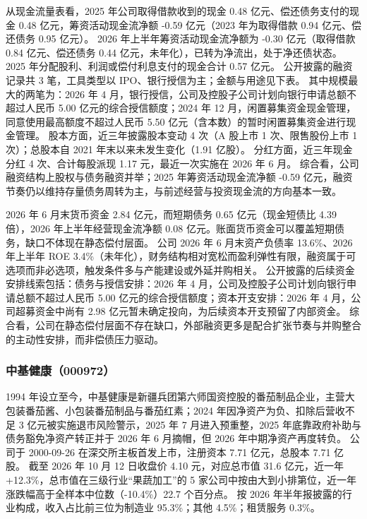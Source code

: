  从现金流量表看，2025 年公司取得借款收到的现金 0.48 亿元、偿还债务支付的现金 0.48 亿元，筹资活动现金流净额 -0.59 亿元（2023 年为取得借款 0.94 亿元、偿还债务 0.95 亿元）。 2026 年上半年筹资活动现金流净额为 -0.30 亿元（取得借款 0.84 亿元、偿还债务 0.44 亿元，未年化），已转为净流出，处于净还债状态。 2025 年分配股利、利润或偿付利息支付的现金合计 0.57 亿元。 公开披露的融资记录共 3 笔，工具类型以 IPO、银行授信为主；金额与用途见下表。 其中规模最大的两笔为：2026 年 4 月，银行授信，公司及控股子公司计划向银行申请总额不超过人民币 5.00 亿元的综合授信额度；2024 年 12 月，闲置募集资金现金管理，同意使用最高额度不超过人民币 5.50 亿元（含本数）的暂时闲置募集资金进行现金管理。 股本方面，近三年披露股本变动 4 次（A 股上市 1 次、限售股份上市 1 次）；总股本自 2021 年末以来未发生变化（1.91 亿股）。 分红方面，近三年现金分红 4 次、合计每股派现 1.17 元，最近一次实施在 2026 年 6 月。 综合看，公司融资结构上股权与债务融资并举；2025 年筹资活动现金流净额 -0.59 亿元，融资节奏仍以维持存量债务周转为主，与前述经营与投资现金流的方向基本一致。

 2026 年 6 月末货币资金 2.84 亿元，而短期债务 0.65 亿元（现金短债比 4.39 倍），2026 年上半年经营现金流净额 0.08 亿元。账面货币资金可以覆盖短期债务，缺口不体现在静态偿付层面。 公司 2026 年 6 月末资产负债率 13.6\%、2026 年上半年 ROE 3.4\%（未年化），财务结构相对宽松而盈利弹性有限，融资属于可选项而非必选项，触发条件多与产能建设或外延并购相关。 公开披露的后续资金安排线索包括：债务与授信安排：2026 年 4 月，公司及控股子公司计划向银行申请总额不超过人民币 5.00 亿元的综合授信额度；资本开支安排：2026 年 4 月，公司超募资金中尚有 2.98 亿元暂未确定投向，为后续资本开支预留了内部资金。 综合看，公司在静态偿付层面不存在缺口，外部融资更多是配合扩张节奏与并购整合的主动性安排，而非偿债压力驱动。




\subsubsection{中基健康（000972）}
\label{co:000972}

 1994 年设立至今，中基健康是新疆兵团第六师国资控股的番茄制品企业，主营大包装番茄酱、小包装番茄制品与番茄红素；2024 年因净资产为负、扣除后营收不足 3 亿元被实施退市风险警示，2025 年 7 月进入预重整，2025 年底靠政府补助与债务豁免净资产转正并于 2026 年 6 月摘帽，但 2026 年中期净资产再度转负。 公司于 2000-09-26 在深交所主板首发上市，注册资本 7.71 亿元，总股本 7.71 亿股。 截至 2026 年 10 月 12 日收盘价 4.10 元，对应总市值 31.6 亿元，近一年+12.3\%，总市值在三级行业“果蔬加工”的 5 家公司中按由大到小排第位，近一年涨跌幅高于全样本中位数（-10.4\%）22.7 个百分点。 按 2026 年半年报披露的行业构成，收入占比前三位为制造业 95.3\%；其他 4.5\%；租赁服务 0.3\%。

